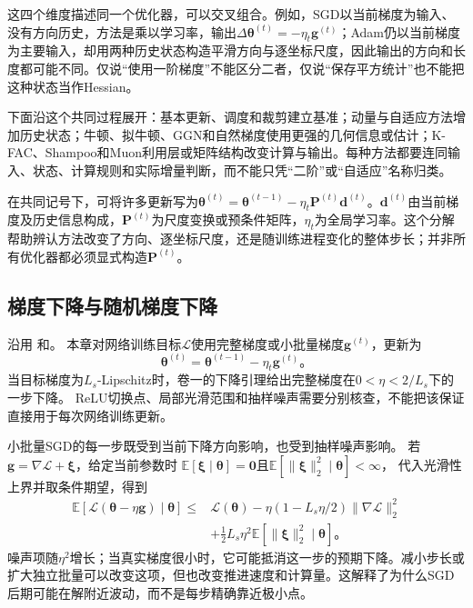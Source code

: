 这四个维度描述同一个优化器，可以交叉组合。例如，SGD以当前梯度为输入、没有方向历史，方法是乘以学习率，输出$\Delta\bm\theta^{(t)}=-\eta_t\bm g^{(t)}$；Adam仍以当前梯度为主要输入，却用两种历史状态构造平滑方向与逐坐标尺度，因此输出的方向和长度都可能不同。仅说“使用一阶梯度”不能区分二者，仅说“保存平方统计”也不能把这种状态当作Hessian。

下面沿这个共同过程展开：基本更新、调度和裁剪建立基准；动量与自适应方法增加历史状态；牛顿、拟牛顿、GGN和自然梯度使用更强的几何信息或估计；K-FAC、Shampoo和Muon利用层或矩阵结构改变计算与输出。每种方法都要连同输入、状态、计算规则和实际增量判断，而不能只凭“二阶”或“自适应”名称归类。

在共同记号下，可将许多更新写为$\bm\theta^{(t)}=\bm\theta^{(t-1)}-\eta_t\bm P^{(t)}\bm d^{(t)}$。$\bm d^{(t)}$由当前梯度及历史信息构成，$\bm P^{(t)}$为尺度变换或预条件矩阵，$\eta_t$为全局学习率。这个分解帮助辨认方法改变了方向、逐坐标尺度，还是随训练进程变化的整体步长；并非所有优化器都必须显式构造$\bm P^{(t)}$。

\subsection{梯度下降与随机梯度下降}
\label{sec:training-gradient-schedules}

沿用
和。
本章对网络训练目标$\mathcal L$使用完整梯度或小批量梯度$\bm g^{(t)}$，更新为
\begin{equation}
  \bm\theta^{(t)}=\bm\theta^{(t-1)}-\eta_t\bm g^{(t)}\text{。}
  \label{eq:training-sgd}
\end{equation}
当目标梯度为$L_s$-Lipschitz时，卷一的下降引理给出完整梯度在$0<\eta<2/L_s$下的一步下降。
ReLU切换点、局部光滑范围和抽样噪声需要分别核查，不能把该保证直接用于每次网络训练更新。

小批量SGD的每一步既受到当前下降方向影响，也受到抽样噪声影响。
若$\bm g=\nabla\mathcal L+\bm\xi$，给定当前参数时
$\mathbb E[\bm\xi\mid\bm\theta]=\bm0$且$\mathbb E[\lVert\bm\xi\rVert_2^2\mid\bm\theta]<\infty$，
代入光滑性上界并取条件期望，得到
\begin{equation}
  \begin{aligned}
  \mathbb E[\mathcal L(\bm\theta-\eta\bm g)\mid\bm\theta]
  \leq{}&\mathcal L(\bm\theta)
    -\eta(1-L_s\eta/2)\lVert\nabla\mathcal L\rVert_2^2\\
    &+\tfrac12L_s\eta^2\mathbb E[\lVert\bm\xi\rVert_2^2\mid\bm\theta]\text{。}
  \end{aligned}
  \label{eq:training-stochastic-descent}
\end{equation}
噪声项随$\eta^2$增长；当真实梯度很小时，它可能抵消这一步的预期下降。减小步长或扩大独立批量可以改变这项，但也改变推进速度和计算量。这解释了为什么SGD后期可能在解附近波动，而不是每步精确靠近极小点。

